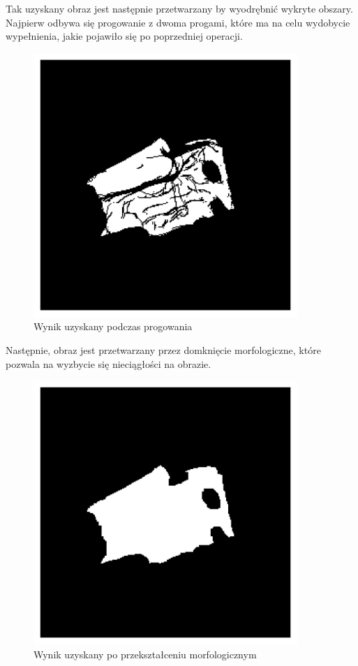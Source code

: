 Tak uzyskany obraz jest następnie przetwarzany by wyodrębnić wykryte obszary. Najpierw odbywa się progowanie z dwoma progami, które ma na celu wydobycie wypełnienia, jakie pojawiło się po poprzedniej operacji. 

\begin{figure}[H]
    \centering
    \includegraphics[width=10cm]{images/Thresholding.jpg}
    \caption{Wynik uzyskany podczas progowania}
\end{figure}

Następnie, obraz jest przetwarzany przez domknięcie morfologiczne, które pozwala na wyzbycie się nieciągłości na obrazie. 

\begin{figure}[H]
    \centering
    \includegraphics[width=10cm]{images/Morphology.jpg}
    \caption{Wynik uzyskany po przekształceniu morfologicznym}
\end{figure}

